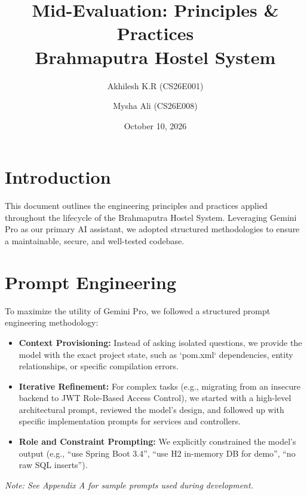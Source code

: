 \documentclass[11pt,a4paper]{article}
\title{Mid-Evaluation: Principles \& Practices \\ Brahmaputra Hostel System}
\author{Akhilesh K.R (CS26E001) \and Mysha Ali (CS26E008)}
\date{October 10, 2026}
\begin{document}
\maketitle

\section{Introduction}
This document outlines the engineering principles and practices applied throughout the lifecycle of the Brahmaputra Hostel System. Leveraging Gemini Pro as our primary AI assistant, we adopted structured methodologies to ensure a maintainable, secure, and well-tested codebase.

\section{Prompt Engineering}
To maximize the utility of Gemini Pro, we followed a structured prompt engineering methodology:
\begin{itemize}[noitemsep]
    \item \textbf{Context Provisioning:} Instead of asking isolated questions, we provide the model with the exact project state, such as `pom.xml` dependencies, entity relationships, or specific compilation errors.
    \item \textbf{Iterative Refinement:} For complex tasks (e.g., migrating from an insecure backend to JWT Role-Based Access Control), we started with a high-level architectural prompt, reviewed the model's design, and followed up with specific implementation prompts for services and controllers.
    \item \textbf{Role and Constraint Prompting:} We explicitly constrained the model's output (e.g., ``use Spring Boot 3.4'', ``use H2 in-memory DB for demo'', ``no raw SQL inserts'').
\end{itemize}
\textit{Note: See Appendix A for sample prompts used during development.}
\end{document}
